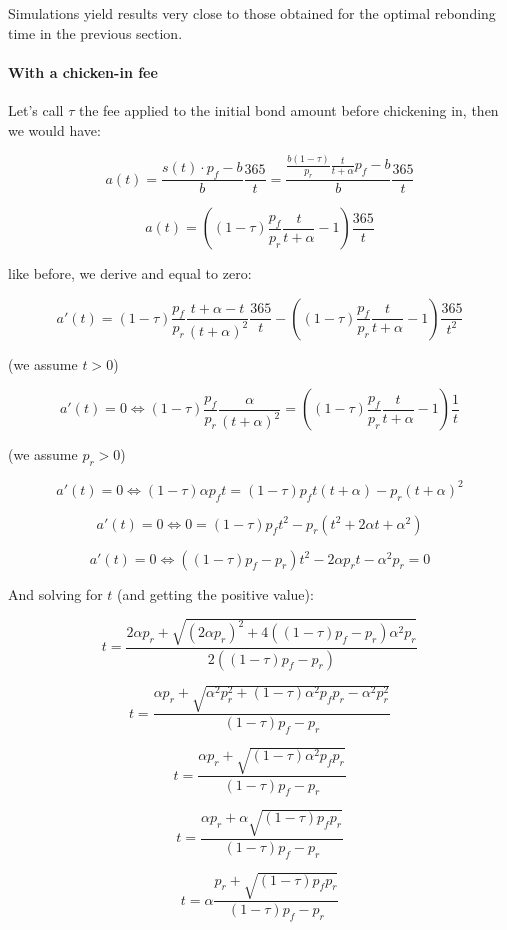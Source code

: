 \documentclass{article}
\begin{document}
Simulations yield results very close to those obtained for the optimal rebonding time in the previous section.

\paragraph{With a chicken-in fee}
 Let’s call $\tau$ the fee applied to the initial bond amount before chickening in, then we would have:

\[
a(t) = \frac{s(t) \cdot p_f - b}{b} \frac{365}{t} = \frac{\frac{b(1-\tau)}{p_r} \frac{t}{t+\alpha} p_f - b}{b} \frac{365}{t}
\]

\begin{equation}
  \label{eq:apr}
a(t) = \left((1-\tau)\frac{p_f}{p_r} \frac{t}{t+\alpha} - 1\right) \frac{365}{t}
\end{equation}

like before, we derive and equal to zero:

\[
a'(t) = (1-\tau)\frac{p_f}{p_r} \frac{t + \alpha - t}{(t+\alpha)^2} \frac{365}{t} - \left((1-\tau)\frac{p_f}{p_r} \frac{t}{t+\alpha} - 1\right) \frac{365}{t^2}
\]

(we assume $t > 0$)

\[
a'(t) = 0 \iff (1-\tau)\frac{p_f}{p_r} \frac{\alpha}{(t+\alpha)^2} = \left((1-\tau)\frac{p_f}{p_r} \frac{t}{t+\alpha} - 1\right) \frac{1}{t}
\]

(we assume $p_r > 0$)

\[
a'(t) = 0 \iff (1-\tau) \alpha p_f t = (1-\tau) p_f t(t+\alpha)  - p_r(t+\alpha)^2
\]

\[
a'(t) = 0 \iff 0 = (1-\tau)p_f t^2 - p_r(t^2+2\alpha t+\alpha^2)
\]

\[
a'(t) = 0 \iff ((1-\tau)p_f-p_r)t^2  - 2\alpha p_r t - \alpha^2 p_r = 0
\]

And solving for $t$ (and getting the positive value):

\[
t = \frac{2\alpha p_r + \sqrt{(2\alpha p_r)^2 + 4((1-\tau)p_f-p_r) \alpha^2 p_r}}{2((1-\tau)p_f-p_r)}
\]

\[
t = \frac{\alpha p_r + \sqrt{\alpha^2 p_r^2 + (1-\tau) \alpha^2 p_f p_r- \alpha^2 p_r^2}}{(1-\tau)p_f-p_r}
\]

\[
t = \frac{\alpha p_r + \sqrt{(1-\tau) \alpha^2 p_f p_r}}{(1-\tau)p_f-p_r}
\]

\[
t = \frac{\alpha p_r + \alpha \sqrt{(1-\tau)p_f p_r}}{(1-\tau)p_f-p_r}
\]

\begin{equation}
  \label{eq:optimal_chicken_in_1_fee}
t = \alpha \frac{p_r + \sqrt{(1-\tau)p_f p_r}}{(1-\tau)p_f-p_r}
\end{equation}
\end{document}
